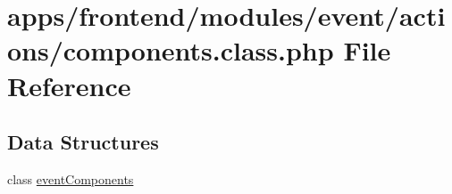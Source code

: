 \hypertarget{frontend_2modules_2event_2actions_2components_8class_8php}{\section{apps/frontend/modules/event/actions/components.class.\-php File Reference}
\label{frontend_2modules_2event_2actions_2components_8class_8php}
}
\subsection*{Data Structures}
\begin{DoxyCompactItemize}
\item 
class \hyperlink{classevent_components}{event\-Components}
\end{DoxyCompactItemize}
